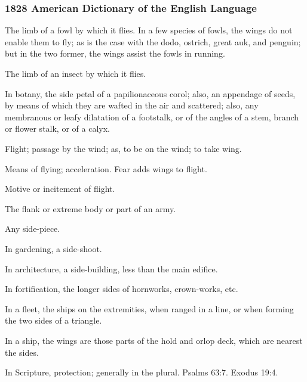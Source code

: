 		\subsubsection{1828 American Dictionary of the English Language}
		
			\begin{compactitem}
				\item[1] The limb of a fowl by which it flies. In a few species of fowls, the wings do not enable them to fly; as is the case with the dodo, ostrich, great auk, and penguin; but in the two former, the wings assist the fowls in running.
				\item[2] The limb of an insect by which it flies.
				\item[3] In botany, the side petal of a papilionaceous corol; also, an appendage of seeds, by means of which they are wafted in the air and scattered; also, any membranous or leafy dilatation of a footstalk, or of the angles of a stem, branch or flower stalk, or of a calyx.
				\item[4] Flight; passage by the wind; as, to be on the wind; to take wing.
				\item[5] Means of flying; acceleration. Fear adds wings to flight.
				\item[6] Motive or incitement of flight.
				\item[7] The flank or extreme body or part of an army.
				\item[8] Any side-piece.
				\item[9] In gardening, a side-shoot.
				\item[10] In architecture, a side-building, less than the main edifice.
				\item[11] In fortification, the longer sides of hornworks, crown-works, etc.
				\item[12] In a fleet, the ships on the extremities, when ranged in a line, or when forming the two sides of a triangle.
				\item[13] In a ship, the wings are those parts of the hold and orlop deck, which are nearest the sides.
				\item[14] In Scripture, protection; generally in the plural. Psalms 63:7. Exodus 19:4.
			\end{compactitem}


